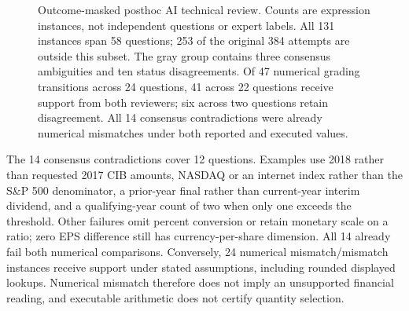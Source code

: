 \begin{figure}[!ht]
\centering
{}
\caption{Outcome-masked posthoc AI technical review. Counts are expression instances, not independent questions or expert labels. All 131 instances span 58 questions; 253 of the original 384 attempts are outside this subset. The gray group contains three consensus ambiguities and ten status disagreements. Of 47 numerical grading transitions across 24 questions, 41 across 22 questions receive support from both reviewers; six across two questions retain disagreement. All 14 consensus contradictions were already numerical mismatches under both reported and executed values.}
\label{fig:expression-semantics}
\end{figure}

The 14 consensus contradictions cover 12 questions. Examples use 2018 rather than requested 2017 CIB amounts, NASDAQ or an internet index rather than the S\&P 500 denominator, a prior-year final rather than current-year interim dividend, and a qualifying-year count of two when only one exceeds the threshold. Other failures omit percent conversion or retain monetary scale on a ratio; zero EPS difference still has currency-per-share dimension. All 14 already fail both numerical comparisons. Conversely, 24 numerical mismatch/mismatch instances receive support under stated assumptions, including rounded displayed lookups. Numerical mismatch therefore does not imply an unsupported financial reading, and executable arithmetic does not certify quantity selection.

